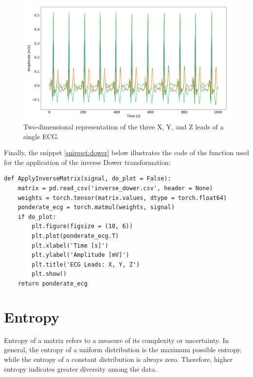 \documentclass[12pt,english]{report}
\begin{document}
\begin{figure}[H]
    \centering
    \includegraphics[width=1\textwidth]{images/frank_2d.png}
    \captionsetup{justification=centering}
    \caption{Two-dimensional representation of the three X, Y, and Z leads of a single ECG.}
    \label{fig:frank_2d}
\end{figure}

Finally, the snippet \ref{snippet:dower} below illustrates the code of the function used for the application of the inverse Dower transformation:

\lstset{language=Python}
\begin{lstlisting}[aboveskip=15pt, belowskip=15pt, basicstyle=\fontsize{8}{10}\selectfont, keywordstyle=\color{blue}, breaklines=true, label=snippet:dower]
def ApplyInverseMatrix(signal, do_plot = False):
    matrix = pd.read_csv('inverse_dower.csv', header = None)
    weights = torch.tensor(matrix.values, dtype = torch.float64)
    ponderate_ecg = torch.matmul(weights, signal)
    if do_plot:
        plt.figure(figsize = (10, 6))
        plt.plot(ponderate_ecg.T)
        plt.xlabel('Time [s]')
        plt.ylabel('Amplitude [mV]')
        plt.title('ECG Leads: X, Y, Z')
        plt.show()
    return ponderate_ecg
\end{lstlisting}

\section{Entropy}
\label{sec:entropia}

Entropy of a matrix refers to a measure of its complexity or uncertainty. In general, the entropy of a uniform distribution is the maximum possible entropy, while the entropy of a constant distribution is always zero. Therefore, higher entropy indicates greater diversity among the data.
\end{document}
